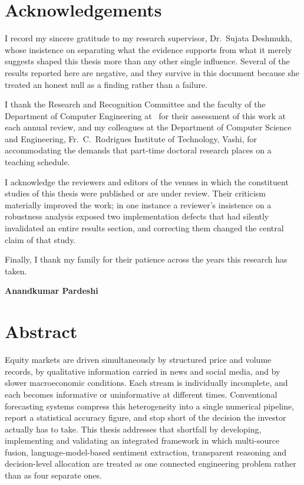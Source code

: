 \chapter*{Acknowledgements}
\thispagestyle{plain}

I record my sincere gratitude to my research supervisor, Dr.~Sujata Deshmukh, whose
insistence on separating what the evidence supports from what it merely suggests shaped
this thesis more than any other single influence. Several of the results reported here
are negative, and they survive in this document because she treated an honest null as a
finding rather than a failure.

I thank the Research and Recognition Committee and the faculty of the Department of
Computer Engineering at \ResearchCentre\ for their assessment of this work at each
annual review, and my colleagues at the Department of Computer Science and Engineering,
Fr.~C.~Rodrigues Institute of Technology, Vashi, for accommodating the demands that
part-time doctoral research places on a teaching schedule.

I acknowledge the reviewers and editors of the venues in which the constituent studies
of this thesis were published or are under review. Their criticism materially improved
the work; in one instance a reviewer's insistence on a robustness analysis exposed two
implementation defects that had silently invalidated an entire results section, and
correcting them changed the central claim of that study.

Finally, I thank my family for their patience across the years this research has taken.

\vspace{1.5cm}
\begin{flushright}
\textbf{Anandkumar Pardeshi}
\end{flushright}

\chapter*{Abstract}
\thispagestyle{plain}

Equity markets are driven simultaneously by structured price and volume records, by
qualitative information carried in news and social media, and by slower macroeconomic
conditions. Each stream is individually incomplete, and each becomes informative or
uninformative at different times. Conventional forecasting systems compress this
heterogeneity into a single numerical pipeline, report a statistical accuracy figure, and
stop short of the decision the investor actually has to take. This thesis addresses that
shortfall by developing, implementing and validating an integrated framework in which
multi-source fusion, language-model-based sentiment extraction, transparent reasoning and
decision-level allocation are treated as one connected engineering problem rather than as
four separate ones.

